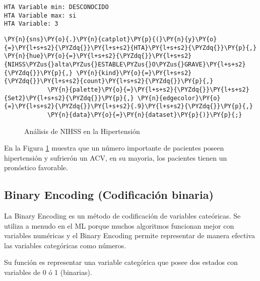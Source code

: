     \begin{Verbatim}[commandchars=\\\{\}]
HTA Variable min: DESCONOCIDO
HTA Variable max: si
HTA Variable: 3
    \end{Verbatim}

    \begin{tcolorbox}[breakable, size=fbox, boxrule=1pt, pad at break*=1mm,colback=cellbackground, colframe=cellborder]
\begin{Verbatim}[commandchars=\\\{\}]
\PY{n}{sns}\PY{o}{.}\PY{n}{catplot}\PY{p}{(}\PY{n}{y}\PY{o}{=}\PY{l+s+s2}{\PYZdq{}}\PY{l+s+s2}{HTA}\PY{l+s+s2}{\PYZdq{}}\PY{p}{,} \PY{n}{hue}\PY{o}{=}\PY{l+s+s2}{\PYZdq{}}\PY{l+s+s2}{NIHSS\PYZus{}alta\PYZus{}ESTABLE\PYZus{}O\PYZus{}GRAVE}\PY{l+s+s2}{\PYZdq{}}\PY{p}{,} \PY{n}{kind}\PY{o}{=}\PY{l+s+s2}{\PYZdq{}}\PY{l+s+s2}{count}\PY{l+s+s2}{\PYZdq{}}\PY{p}{,}
            \PY{n}{palette}\PY{o}{=}\PY{l+s+s2}{\PYZdq{}}\PY{l+s+s2}{Set2}\PY{l+s+s2}{\PYZdq{}}\PY{p}{,} \PY{n}{edgecolor}\PY{o}{=}\PY{l+s+s2}{\PYZdq{}}\PY{l+s+s2}{.9}\PY{l+s+s2}{\PYZdq{}}\PY{p}{,}
            \PY{n}{data}\PY{o}{=}\PY{n}{dataset}\PY{p}{)}\PY{p}{;}
\end{Verbatim}
\end{tcolorbox}

\begin{center}
    	\begin{figure}[H]
	\centering
	\caption{Análisis de NIHSS en la Hipertensión}
	\label{fig:aNISSHiper}
	\end{figure}
\end{center}
    
    En la Figura \ref{fig:aNISSHiper} muestra que un número importante de pacientes poseen hipertensión y sufrierón un ACV, en su mayoria, los pacientes tienen un pronóstico favorable.

    \hypertarget{binary-encoding-codificaciuxf3n-binaria}{%
\subsection{Binary Encoding (Codificación binaria)}\label{binary-encoding-codificaciuxf3n-binaria}}

	La Binary Encoding es un método de codificación de variables cateóricas.  Se utiliza a menudo en el ML porque muchos algoritmos funcionan mejor con variables numéricas y el Binary Encoding permite representar de manera efectiva las variables categóricas como números. 
\par Su función es representar una variable categórica que posee dos estados con variables de 0 ó 1 (binarias)\cite{Hancock2020}.


